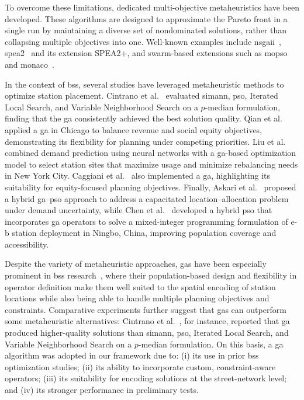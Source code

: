 To overcome these limitations, dedicated multi-objective metaheuristics have been developed. These algorithms are designed to approximate the Pareto front in a single run by maintaining a diverse set of nondominated solutions, rather than collapsing multiple objectives into one. Well-known examples include \ac{nsgaii}~\cite{Deb2002}, \ac{spea2}~\cite{Zitzler2001} and its extension SPEA2+\cite{Kim2004}, and swarm-based extensions such as \ac{mopso}~\cite{Coello2002} and \ac{monaco}~\cite{Cardoso2010}.

In the context of \ac{bss}, several studies have leveraged metaheuristic methods to optimize station placement. Cintrano et al.~\cite{Cintrano2018} evaluated \ac{simann}, \ac{pso}, Iterated Local Search, and Variable Neighborhood Search on a $p$-median formulation, finding that the \ac{ga} consistently achieved the best solution quality. Qian et al.~\cite{Qian2022} applied a \ac{ga} in Chicago to balance revenue and social equity objectives, demonstrating its flexibility for planning under competing priorities. Liu et al.~\cite{Liu2015} combined demand prediction using neural networks with a \ac{ga}-based optimization model to select station sites that maximize usage and minimize rebalancing needs in New York City. Caggiani et al.~\cite{Caggiani2020} also implemented a \ac{ga}, highlighting its suitability for equity-focused planning objectives. Finally, Askari et al.~\cite{Askari2017} proposed a hybrid \ac{ga}–\ac{pso} approach to address a capacitated location–allocation problem under demand uncertainty, while Chen et al.~\cite{Chen2020_optimal} developed a hybrid \ac{pso} that incorporates \ac{ga} operators to solve a mixed-integer programming formulation of \ac{e-b} station deployment in Ningbo, China, improving population coverage and accessibility.

Despite the variety of metaheuristic approaches, \acp{ga} have been especially prominent in \ac{bss} research~\cite{Cintrano2018, Liu2015, Caggiani2020, Qian2022}, where their population-based design and flexibility in operator definition make them well suited to the spatial encoding of station locations while also being able to handle multiple planning objectives and constraints. Comparative experiments further suggest that \acp{ga} can outperform some metaheuristic alternatives: Cintrano et al.~\cite{Cintrano2018}, for instance, reported that \ac{ga} produced higher-quality solutions than \ac{simann}, \ac{pso}, Iterated Local Search, and Variable Neighborhood Search on a $p$-median formulation. On this basis, a \ac{ga} algorithm was adopted in our framework due to: (i) its use in prior \ac{bss} optimization studies; (ii) its ability to incorporate custom, constraint-aware operators; (iii) its suitability for encoding solutions at the street-network level; and (iv) its stronger performance in preliminary tests.

